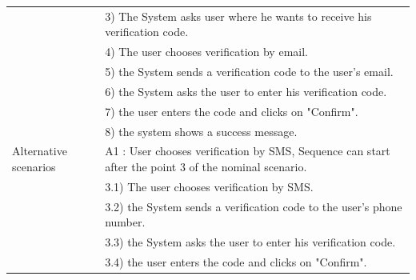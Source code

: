 \documentclass[]{uc2pfecaneva}
\begin{document}
\begin{table}[h]
\begin{tabularx}{\textwidth}{|l|X|}
            & 3) The System asks user where he wants to receive his verification code.                                                                                             \\
            & 4) The user chooses verification by email.                                                                                                                           \\
            & 5) the System sends a verification code to the user's email.                                                                                                         \\
            & 6) the System asks the user to enter his verification code.                                                                                                          \\
            & 7) the user enters the code and clicks on "Confirm".                                                                                                                 \\
            & 8) the system shows a success message.                                                                                                                               \\ \hline
            Alternative scenarios
            & A1 : User chooses verification by SMS,  Sequence can start after the point 3 of the nominal scenario.                                                                \\
            & \hspace{4mm}3.1) The user chooses verification by SMS.                                                                                                               \\
            & \hspace{4mm}3.2) the System sends a verification code to the user's phone number.                                                                                    \\
            & \hspace{4mm}3.3) the System asks the user to enter his verification code.                                                                                            \\
            & \hspace{4mm}3.4) the user enters the code and clicks on "Confirm".                                                                                                   \\

\end{tabularx}
\end{table}
\end{document}
